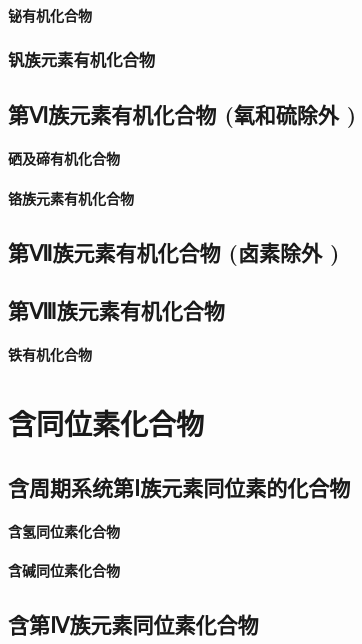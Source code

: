 \documentclass[UTF8]{../03-Chemistry}
\begin{document}
        \subsubsection{铋有机化合物}
    \subsection{钒族元素有机化合物}
\section{第Ⅵ族元素有机化合物 (氧和硫除外 )}
    \subsubsection{硒及碲有机化合物}
    \subsubsection{铬族元素有机化合物}
\section{第Ⅶ族元素有机化合物 (卤素除外 )}
\section{第Ⅷ族元素有机化合物}
    \subsubsection{铁有机化合物}










\chapter{含同位素化合物}
\section{含周期系统第Ⅰ族元素同位素的化合物}
    \subsubsection{含氢同位素化合物}
    \subsubsection{含碱同位素化合物}
\section{含第Ⅳ族元素同位素化合物}
\end{document}
